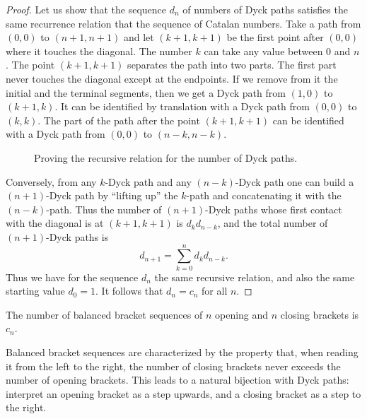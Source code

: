 \begin{page}

\begin{proof}
Let us show that the sequence $d_n$ of numbers of Dyck paths satisfies the same recurrence relation that the sequence of Catalan numbers.
Take a path from $(0,0)$ to $(n+1,n+1)$ and let $(k+1,k+1)$ be the first point after $(0,0)$ where it touches the diagonal.
The number $k$ can take any value between $0$ and $n$.
The point $(k+1,k+1)$ separates the path into two parts.
The first part never touches the diagonal except at the endpoints.
If we remove from it the initial and the terminal segments, then we get a Dyck path from $(1,0)$ to $(k+1,k)$.
It can be identified by translation with a Dyck path from $(0,0)$ to $(k,k)$.
The part of the path after the point $(k+1,k+1)$ can be identified with a Dyck path from $(0,0)$ to $(n-k,n-k)$.

\begin{figure}[ht]
\begin{center}

\end{center}
\caption{Proving the recursive relation for the number of Dyck paths.}
\label{fig:DyckInduction}
\end{figure}

Conversely, from any $k$-Dyck path and any $(n-k)$-Dyck path one can build a $(n+1)$-Dyck path
by ``lifting up'' the $k$-path and concatenating it with the $(n-k)$-path.
Thus the number of $(n+1)$-Dyck paths whose first contact with the diagonal is at $(k+1, k+1)$ is $d_k d_{n-k}$,
and the total number of $(n+1)$-Dyck paths is
\[
d_{n+1} = \sum_{k=0}^n d_k d_{n-k}.
\]
Thus we have for the sequence $d_n$ the same recursive relation, and also the same starting value $d_0 = 1$.
It follows that $d_n = c_n$ for all $n$.
\end{proof}




\end{page}

\begin{page}

\begin{cor}
The number of balanced bracket sequences of $n$ opening and $n$ closing brackets is $c_n$.
\end{cor}

\end{page}

\begin{page}

Balanced bracket sequences are characterized by the property that,
when reading it from the left to the right, the number of closing brackets never exceeds the number of opening brackets.
This leads to a natural bijection with Dyck paths: interpret an opening bracket as a step upwards, and a closing bracket as a step to the right.



\end{page}

